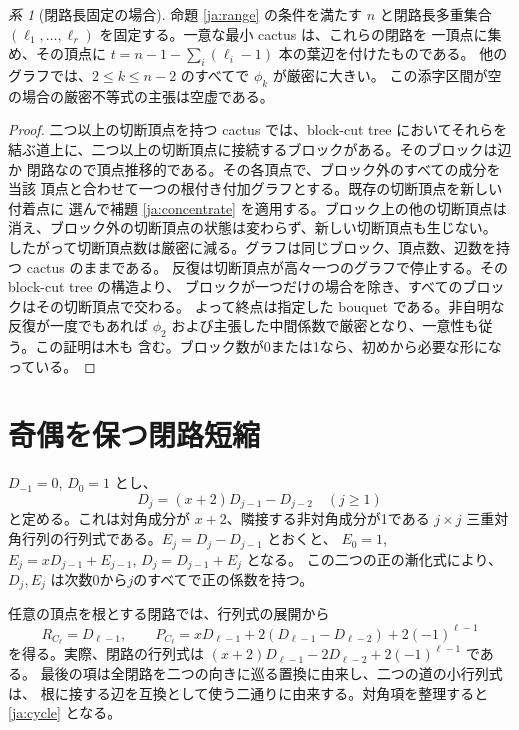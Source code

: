 \documentclass[12pt]{amsart}
\theoremstyle{definition}
\theoremstyle{remark}
\numberwithin{equation}{section}
\newtheorem{jcor}[thm]{系}
\begin{document}
\begin{jcor}[閉路長固定の場合]\label{ja:lengths}
命題 \ref{ja:range} の条件を満たす $n$ と閉路長多重集合
$(\ell_1,\ldots,\ell_r)$ を固定する。一意な最小 cactus は、これらの閉路を
一頂点に集め、その頂点に $t=n-1-\sum_i(\ell_i-1)$ 本の葉辺を付けたものである。
他のグラフでは、$2\le k\le n-2$ のすべてで $\phi_k$ が厳密に大きい。
この添字区間が空の場合の厳密不等式の主張は空虚である。
\end{jcor}
\begin{proof}
二つ以上の切断頂点を持つ cactus では、block-cut tree においてそれらを
結ぶ道上に、二つ以上の切断頂点に接続するブロックがある。そのブロックは辺か
閉路なので頂点推移的である。その各頂点で、ブロック外のすべての成分を当該
頂点と合わせて一つの根付き付加グラフとする。既存の切断頂点を新しい付着点に
選んで補題 \ref{ja:concentrate} を適用する。ブロック上の他の切断頂点は
消え、ブロック外の切断頂点の状態は変わらず、新しい切断頂点も生じない。
したがって切断頂点数は厳密に減る。グラフは同じブロック、頂点数、辺数を持つ
cactus のままである。
反復は切断頂点が高々一つのグラフで停止する。その block-cut tree の構造より、
ブロックが一つだけの場合を除き、すべてのブロックはその切断頂点で交わる。
よって終点は指定した bouquet である。非自明な反復が一度でもあれば
$\phi_2$ および主張した中間係数で厳密となり、一意性も従う。この証明は木も
含む。ブロック数が0または1なら、初めから必要な形になっている。
\end{proof}

\section{奇偶を保つ閉路短縮}
$D_{-1}=0$, $D_0=1$ とし、
\begin{equation}\label{ja:D}
 D_j=(x+2)D_{j-1}-D_{j-2}\quad(j\ge1)
\end{equation}
と定める。これは対角成分が $x+2$、隣接する非対角成分が1である
$j\times j$ 三重対角行列の行列式である。$E_j=D_j-D_{j-1}$ とおくと、
$E_0=1$, $E_j=xD_{j-1}+E_{j-1}$, $D_j=D_{j-1}+E_j$ となる。
この二つの正の漸化式により、$D_j,E_j$ は次数0から$j$のすべてで正の係数を持つ。

任意の頂点を根とする閉路では、行列式の展開から
\begin{equation}\label{ja:cycle}
 R_{C_\ell}=D_{\ell-1},\qquad
 P_{C_\ell}=xD_{\ell-1}
         +2(D_{\ell-1}-D_{\ell-2})+2(-1)^{\ell-1}
\end{equation}
を得る。実際、閉路の行列式は
$(x+2)D_{\ell-1}-2D_{\ell-2}+2(-1)^{\ell-1}$ である。
最後の項は全閉路を二つの向きに巡る置換に由来し、二つの道の小行列式は、
根に接する辺を互換として使う二通りに由来する。対角項を整理すると
\eqref{ja:cycle} となる。
\end{document}
